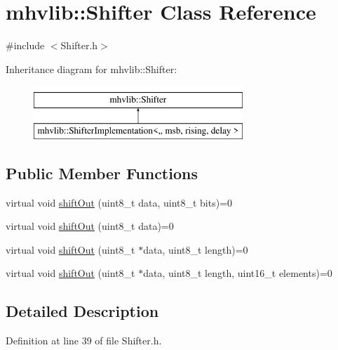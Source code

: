 \hypertarget{classmhvlib_1_1_shifter}{\section{mhvlib\-:\-:Shifter Class Reference}
\label{classmhvlib_1_1_shifter}
}


{\ttfamily \#include $<$Shifter.\-h$>$}

Inheritance diagram for mhvlib\-:\-:Shifter\-:\begin{figure}[H]
\begin{center}
\leavevmode
\includegraphics[height=2.000000cm]{classmhvlib_1_1_shifter}
\end{center}
\end{figure}
\subsection*{Public Member Functions}
\begin{DoxyCompactItemize}
\item 
virtual void \hyperlink{classmhvlib_1_1_shifter_a5f39bd41f5931868b54888acb6cfeb67}{shift\-Out} (uint8\-\_\-t data, uint8\-\_\-t bits)=0
\item 
virtual void \hyperlink{classmhvlib_1_1_shifter_ac6d6e32b889200af7c79b6a07de9eb31}{shift\-Out} (uint8\-\_\-t data)=0
\item 
virtual void \hyperlink{classmhvlib_1_1_shifter_a74b0746736e587c7d078a91dbcce1461}{shift\-Out} (uint8\-\_\-t $\ast$data, uint8\-\_\-t length)=0
\item 
virtual void \hyperlink{classmhvlib_1_1_shifter_aad5a6f74cbdf27ef51032ef8e9bf07a6}{shift\-Out} (uint8\-\_\-t $\ast$data, uint8\-\_\-t length, uint16\-\_\-t elements)=0
\end{DoxyCompactItemize}


\subsection{Detailed Description}


Definition at line 39 of file Shifter.\-h.




